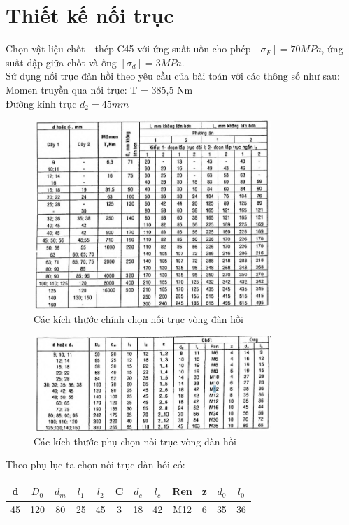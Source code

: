 \section{Thiết kế nối trục}
Chọn vật liệu chốt - thép C45 với ứng suất uốn cho phép $[\sigma_F] = 70MPa$, ứng suất dập giữa chốt và ống $[\sigma_d] = 3MPa$. \\ 
Sử dụng nối trục đàn hồi theo yêu cầu của bài toán với các thông số như sau:\\
Momen truyền qua nối trục: T = 385,5 Nm \\
Đường kính trục $d_2 = 45mm$\\
\begin{figure}[H]
    \centering
    \includegraphics[width=0.8\textwidth]{pictures/noitruc.png}
    \caption{Các kích thước chính chọn nối trục vòng đàn hồi}
\end{figure}
\begin{figure}[H]
    \centering
    \includegraphics[width=0.8\textwidth]{pictures/noitruc2.png}
    \caption{Các kích thước phụ chọn nối trục vòng đàn hồi}
\end{figure}
Theo phụ lục ta chọn nối trục đàn hồi có: 
\begin{center}
\begin{tabular}{|c|c|c|c|c|c|c|c|c|c|c|c|}
    \hline
    d & $D_0 $  & $d_m$  & $l_1$  & $l_2$  & C  & $d_c$  & $l_c$  & Ren  & z  & $d_0$  & $l_0$ \\
    \hline
    45 & 120 & 80 & 25 & 45 & 3 & 18 & 42 & M12 & 6 & 35 & 36 \\
    \hline
\end{tabular}
\end{center}
